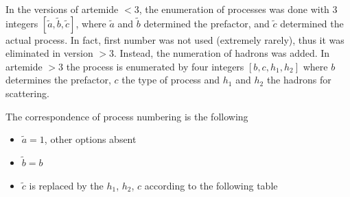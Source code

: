 \documentclass[prd,nofootinbib,eqsecnum,final]{revtex4}
\renewcommand{\(}{\left(}
\renewcommand{\)}{\right)}
\renewcommand{\[}{\left[}
\renewcommand{\]}{\right]}
\begin{document}
In the versions of artemide $<3$, the enumeration of processes was done with 3 integers $[\tilde a,\tilde b,\tilde c]$, where $\tilde a$ and $\tilde b$ determined the prefactor, and $\tilde c$ determined the actual process. In fact, first number was not used (extremely rarely), thus it was eliminated in version $>3$. Instead, the numeration of hadrons was added. In artemide $>3$ the process is enumerated by four integers $[b,c,h_1,h_2]$ where $b$ determines the prefactor, $c$ the type of process and $h_1$ and $h_2$ the hadrons for scattering.

The correspondence of process numbering is the following
\begin{itemize}
\item $\tilde a=1$, other options absent
\item $\tilde b=b$
\item $\tilde c$ is replaced by the $h_1$, $h_2$, $c$ according to the following table
\end{itemize}
\end{document}
